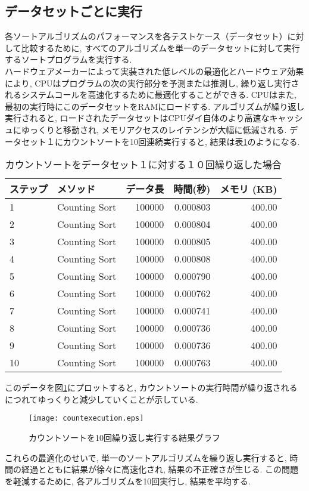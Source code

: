 \documentclass[a4j, 11pt]{jarticle}
\begin{document}
\subsection{データセットごとに実行}
各ソートアルゴリズムのパフォーマンスを各テストケース（データセット）に対して比較するために, すべてのアルゴリズムを単一のデータセットに対して実行するソートプログラムを実行する. \\
ハードウェアメーカーによって実装された低レベルの最適化とハードウェア効果により, CPUはプログラムの次の実行部分を予測または推測し, 繰り返し実行されるシステムコールを高速化するために最適化することができる\cite{mittal2018branch}. CPUはまた, 最初の実行時にこのデータセットをRAMにロードする. アルゴリズムが繰り返し実行されると, ロードされたデータセットはCPUダイ自体のより高速なキャッシュにゆっくりと移動され, メモリアクセスのレイテンシが大幅に低減される\cite{apple2023siliconcpuopt}. データセット１にカウントソートを10回連続実行すると, 結果は表\ref{repeatedsortresult}のようになる. 
\begin{table}[H]
  \centering
  \caption{カウントソートをデータセット１に対する１０回繰り返した場合}\label{repeatedsortresult}
  \begin{tabular}{|l|l|r|r|r|}
    \hline
    \textbf{ステップ} & \textbf{メソッド} & \textbf{データ長} & \textbf{時間(秒)} & \textbf{メモリ (KB)} \\
    \hline
    1 & Counting Sort & 100000 & 0.000803 & 400.00 \\
    2 & Counting Sort & 100000 & 0.000804 & 400.00 \\
    3 & Counting Sort & 100000 & 0.000805 & 400.00 \\
    4 & Counting Sort & 100000 & 0.000808 & 400.00 \\
    5 & Counting Sort & 100000 & 0.000790 & 400.00 \\
    6 & Counting Sort & 100000 & 0.000762 & 400.00 \\
    7 & Counting Sort & 100000 & 0.000741 & 400.00 \\
    8 & Counting Sort & 100000 & 0.000736 & 400.00 \\
    9 & Counting Sort & 100000 & 0.000736 & 400.00 \\
    10 & Counting Sort & 100000 & 0.000763 & 400.00 \\
    \hline
  \end{tabular}
\end{table}
このデータを図\ref{repeatedsortgraph}にプロットすると, カウントソートの実行時間が繰り返されるにつれてゆっくりと減少していくことが示している. \\
\begin{figure}[H]
  \centering
  \texttt{[image: countexecution.eps]}
  \caption{カウントソートを10回繰り返し実行する結果グラフ}\label{repeatedsortgraph}
\end{figure}
これらの最適化のせいで, 単一のソートアルゴリズムを繰り返し実行すると, 時間の経過とともに結果が徐々に高速化され, 結果の不正確さが生じる. この問題を軽減するために, 各アルゴリズムを10回実行し, 結果を平均する. \
\newpage
\end{document}
